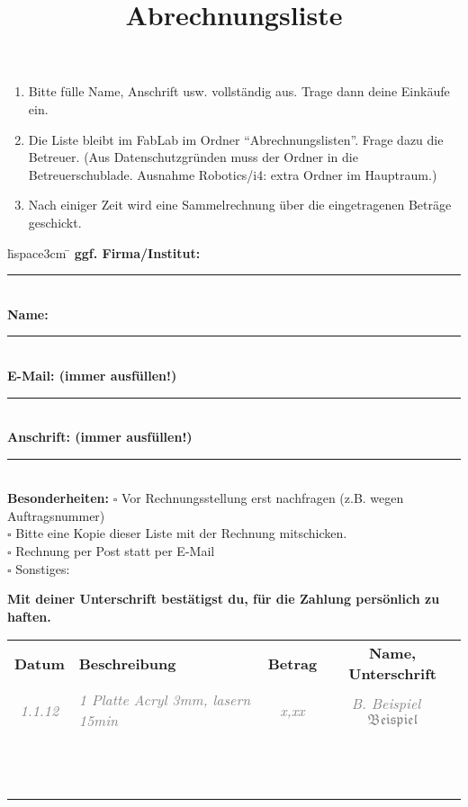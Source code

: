 \documentclass{\basedir fablab-document}
\date{}
\author{}
\title{Abrechnungsliste}
\newcommand{\thickhline}{\noalign{\hrule height 2pt}}
\begin{document}
	\vspace*{-5em}
\begin{enumerate}
	\item Bitte fülle Name, Anschrift usw. vollständig aus. Trage dann deine Einkäufe ein.
	\item Die Liste bleibt im FabLab im Ordner \enquote{Abrechnungslisten}. Frage dazu die Betreuer. {\small (Aus Datenschutzgründen muss der Ordner in die Betreuerschublade. Ausnahme Robotics/i4: extra Ordner im Hauptraum.) }
	\item Nach einiger Zeit wird eine Sammelrechnung über die eingetragenen Beträge geschickt.
\end{enumerate} 


\newcommand{\breite}{12.5cm}

\begin{tabbing}
\hspace{5cm} \= hspace{3cm}  \= \kill
\textbf{ggf. Firma/Institut: }\> \rule{\breite}{0.4pt}\\[2ex]
\textbf{Name:} \> \rule{\breite}{0.4pt}\\[2ex]
\textbf{E-Mail: {\small (immer ausfüllen!)}}\> \rule{\breite}{0.4pt} \\[3ex]
\textbf{Anschrift: {\small (immer ausfüllen!)} } \> \rule{\breite}{0.4pt} \\[2ex]
\textbf{Besonderheiten: }\> $\square$ Vor Rechnungsstellung erst nachfragen (z.B. wegen Auftragsnummer)\\
\> $\square$ Bitte eine Kopie dieser Liste mit der Rechnung mitschicken.\\
\> $\square$ Rechnung per Post statt per E-Mail\\
\> $\square$ Sonstiges:
\end{tabbing}

\textbf{\large Mit deiner Unterschrift bestätigst du, für die Zahlung persönlich zu haften.}

\newcommand{\bsp}[1]{\textcolor{gray}{\itshape #1}}
\newcommand{\beispielzeile}[5]{\bsp{#2} & \bsp{#3} & \bsp{#4} & \bsp{#5} \\ \hline}
\newcommand{\leerzeile}{\vbox{\vspace{2.4em}} & & & \\ \hline}
\vspace{-.4em}
\begin{tabularx}{\textwidth}{|c|X|c|c|} \hline
\bfseries Datum      &  \bfseries Beschreibung  & \bfseries Betrag & \bfseries Name, Unterschrift \\\thickhline
\beispielzeile{BSP}{1.1.12}{1 Platte Acryl 3mm, lasern 15min}{x,xx}{B. Beispiel ~ $\mathfrak{Beispiel}$}
\leerzeile
\leerzeile
\leerzeile
\leerzeile
\leerzeile
\leerzeile
\leerzeile
\leerzeile
\leerzeile
\leerzeile
\leerzeile
\leerzeile
\end{tabularx}
\end{document}
